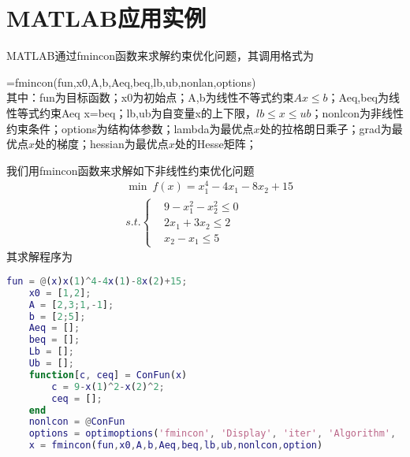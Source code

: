 \section{MATLAB应用实例}
    \par
    MATLAB通过fmincon函数来求解约束优化问题，其调用格式为
    \par
    [x,fval,exitflag,output,lambda,grad,hessian]=fmincon(fun,x0,A,b,Aeq,beq,lb,ub,nonlan,options)\\
    其中：fun为目标函数；x0为初始点；A,b为线性不等式约束$Ax \leqslant b$；Aeq,beq为线性等式约束Aeq x=beq；lb,ub为自变量x的上下限，$lb \leqslant x \leqslant ub$；nonlcon为非线性约束条件；options为结构体参数；lambda为最优点$x$处的拉格朗日乘子；grad为最优点$x$处的梯度；hessian为最优点$x$处的Hesse矩阵；
    \par
    我们用fmincon函数来求解如下非线性约束优化问题
    \begin{align*}
    &\mathop {\min}\  f(x)=x_1^4-4x_1-8x_2+15\\
    &s.t.\left\{
    \begin{aligned}
    &9-x_1^2-x_2^2 \leqslant 0\\
    &2x_1+3x_2 \leqslant 2\\
    &x_2-x_1 \leqslant 5
    \end{aligned}
    \right.
    \end{align*}
    其求解程序为
    \begin{lstlisting}[language=Matlab]
    fun = @(x)x(1)^4-4x(1)-8x(2)+15;
    x0 = [1,2];
    A = [2,3;1,-1];
    b = [2;5];
    Aeq = [];
    beq = [];
    Lb = [];
    Ub = [];
    function[c, ceq] = ConFun(x)
        c = 9-x(1)^2-x(2)^2;
        ceq = [];
    end
    nonlcon = @ConFun
    options = optimoptions('fmincon', 'Display', 'iter', 'Algorithm', 'sqp');
    x = fmincon(fun,x0,A,b,Aeq,beq,lb,ub,nonlcon,option)
    \end{lstlisting}


